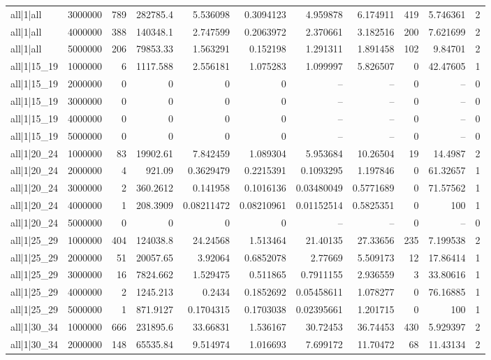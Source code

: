 \begin{tabular}{lrrrrrrrrrr}
all|1|all & 3000000 & 789 & 282785.4 & 5.536098 & 0.3094123 & 4.959878 & 6.174911 & 419 & 5.746361 & 2 \\
all|1|all & 4000000 & 388 & 140348.1 & 2.747599 & 0.2063972 & 2.370661 & 3.182516 & 200 & 7.621699 & 2 \\
all|1|all & 5000000 & 206 & 79853.33 & 1.563291 & 0.152198 & 1.291311 & 1.891458 & 102 & 9.84701 & 2 \\
all|1|15\_19 & 1000000 & 6 & 1117.588 & 2.556181 & 1.075283 & 1.099997 & 5.826507 & 0 & 42.47605 & 1 \\
all|1|15\_19 & 2000000 & 0 & 0 & 0 & 0 & -- & -- & 0 & -- & 0 \\
all|1|15\_19 & 3000000 & 0 & 0 & 0 & 0 & -- & -- & 0 & -- & 0 \\
all|1|15\_19 & 4000000 & 0 & 0 & 0 & 0 & -- & -- & 0 & -- & 0 \\
all|1|15\_19 & 5000000 & 0 & 0 & 0 & 0 & -- & -- & 0 & -- & 0 \\
all|1|20\_24 & 1000000 & 83 & 19902.61 & 7.842459 & 1.089304 & 5.953684 & 10.26504 & 19 & 14.4987 & 2 \\
all|1|20\_24 & 2000000 & 4 & 921.09 & 0.3629479 & 0.2215391 & 0.1093295 & 1.197846 & 0 & 61.32657 & 1 \\
all|1|20\_24 & 3000000 & 2 & 360.2612 & 0.141958 & 0.1016136 & 0.03480049 & 0.5771689 & 0 & 71.57562 & 1 \\
all|1|20\_24 & 4000000 & 1 & 208.3909 & 0.08211472 & 0.08210961 & 0.01152514 & 0.5825351 & 0 & 100 & 1 \\
all|1|20\_24 & 5000000 & 0 & 0 & 0 & 0 & -- & -- & 0 & -- & 0 \\
all|1|25\_29 & 1000000 & 404 & 124038.8 & 24.24568 & 1.513464 & 21.40135 & 27.33656 & 235 & 7.199538 & 2 \\
all|1|25\_29 & 2000000 & 51 & 20057.65 & 3.92064 & 0.6852078 & 2.77669 & 5.509173 & 12 & 17.86414 & 1 \\
all|1|25\_29 & 3000000 & 16 & 7824.662 & 1.529475 & 0.511865 & 0.7911155 & 2.936559 & 3 & 33.80616 & 1 \\
all|1|25\_29 & 4000000 & 2 & 1245.213 & 0.2434 & 0.1852692 & 0.05458611 & 1.078277 & 0 & 76.16885 & 1 \\
all|1|25\_29 & 5000000 & 1 & 871.9127 & 0.1704315 & 0.1703038 & 0.02395661 & 1.201715 & 0 & 100 & 1 \\
all|1|30\_34 & 1000000 & 666 & 231895.6 & 33.66831 & 1.536167 & 30.72453 & 36.74453 & 430 & 5.929397 & 2 \\
all|1|30\_34 & 2000000 & 148 & 65535.84 & 9.514974 & 1.016693 & 7.699172 & 11.70472 & 68 & 11.43134 & 2 \\

\end{tabular}
